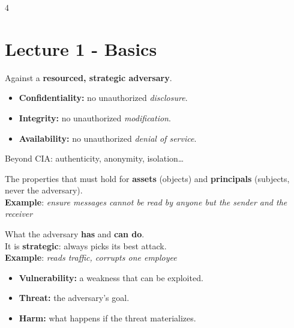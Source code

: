 \documentclass[8pt,a4paper,landscape]{extarticle}
\begin{document}
\begin{multicols*}{4}


\section{Lecture 1 - Basics}

\begin{defn}[title=CIA triad (must hold)]
    Against a \textbf{resourced, strategic adversary}.
    \begin{itemize}
        \item \textbf{Confidentiality:} no unauthorized \textit{disclosure}.
        \item \textbf{Integrity:} no unauthorized \textit{modification}.
        \item \textbf{Availability:} no unauthorized \textit{denial of service}.
    \end{itemize}
    Beyond CIA: authenticity, anonymity, isolation\ldots
\end{defn}

\begin{thm}[title=Security policy]
    The properties that must hold for \textbf{assets} (objects) and \textbf{principals} (subjects, never the adversary).\\
    \textbf{Example}: \textit{ensure messages cannot be read by anyone but the sender and the receiver}
\end{thm}

\begin{defn}[title=Threat model]
    What the adversary \textbf{has} and \textbf{can do}.\\
    It is \textbf{strategic}: always picks its best attack.\\
    \textbf{Example}: \textit{reads traffic, corrupts one employee}
\end{defn}

\begin{prop}[title={Vulnerability, threat, harm}]
    \begin{itemize}
        \item \textbf{Vulnerability:} a weakness that can be exploited.
        \item \textbf{Threat:} the adversary's goal.
        \item \textbf{Harm:} what happens if the threat materializes.
    \end{itemize}
\end{prop}


\end{multicols*}
\end{document}
